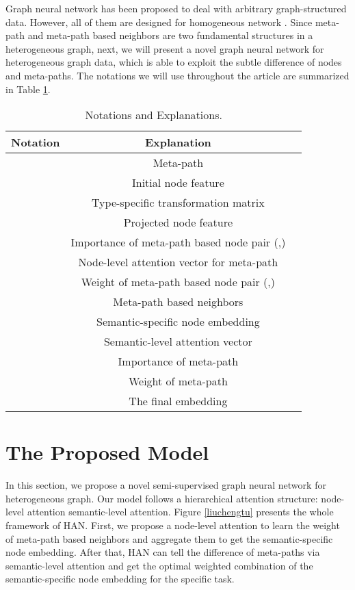 Graph neural network has been proposed to deal with arbitrary graph-structured data. However, all of them are designed for homogeneous network \cite{gcn,gat}. Since meta-path and meta-path based neighbors are two fundamental structures in a heterogeneous graph, next, we will present a novel graph neural network for heterogeneous graph data, which is able to exploit the subtle difference of nodes and meta-paths. The notations we will use throughout the article are summarized in Table \ref{tab_notation}.

\begin{table}
	\caption{Notations and Explanations.}
	\label{tab_notation}
	\begin{tabular}{ccl}
		\toprule
		Notation&Explanation\\
		\midrule
		


		 & Meta-path \\
		& Initial node feature \\
		 & Type-specific transformation matrix \\
		& Projected node feature \\
		 & Importance of meta-path based node pair (,) \\
		 & Node-level attention vector for meta-path  \\
		 & Weight of 
		meta-path based node pair (,) \\
		
		 & Meta-path based neighbors \\
		 & Semantic-specific node embedding \\
		 & Semantic-level attention vector \\
		
		 & Importance of meta-path  \\
		 & Weight of meta-path  \\
		 & The final embedding \\
		\bottomrule
	\end{tabular}
\end{table}



\section{The Proposed Model}
In this section, we propose a novel semi-supervised graph neural network for heterogeneous graph.
Our model follows a hierarchical attention structure: node-level attention  semantic-level attention. Figure \ref{liuchengtu} presents the whole framework of HAN. 
First, we propose a node-level attention to learn the weight of meta-path based neighbors and aggregate them to get the semantic-specific node embedding.
After that, HAN can tell the difference of meta-paths via semantic-level attention and 
get the optimal weighted combination of  the semantic-specific node embedding for the specific task. 



